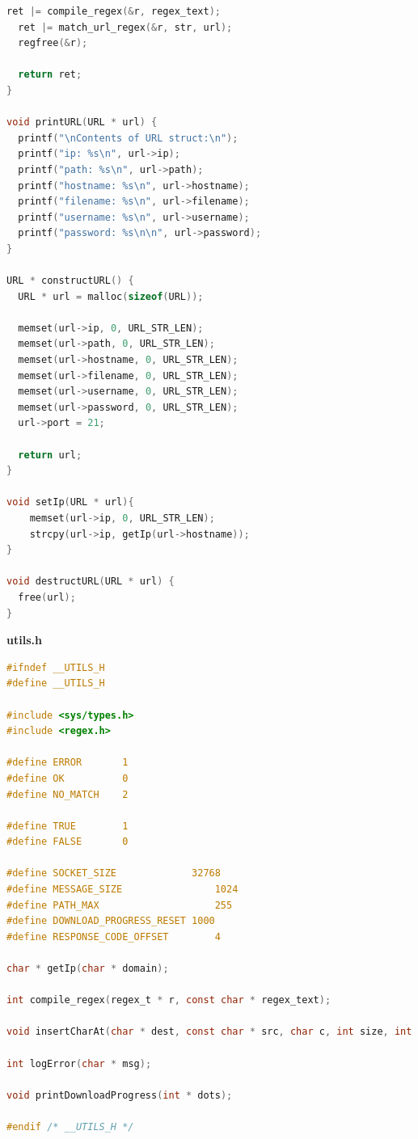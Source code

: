 \documentclass[a4paper, 11pt]{article}
\begin{document}
\begin{lstlisting}[language=C]
  ret |= compile_regex(&r, regex_text);
  ret |= match_url_regex(&r, str, url);
  regfree(&r);

  return ret;
}

void printURL(URL * url) {
  printf("\nContents of URL struct:\n");
  printf("ip: %s\n", url->ip);
  printf("path: %s\n", url->path);
  printf("hostname: %s\n", url->hostname);
  printf("filename: %s\n", url->filename);
  printf("username: %s\n", url->username);
  printf("password: %s\n\n", url->password);
}

URL * constructURL() {
  URL * url = malloc(sizeof(URL));

  memset(url->ip, 0, URL_STR_LEN);
  memset(url->path, 0, URL_STR_LEN);
  memset(url->hostname, 0, URL_STR_LEN);
  memset(url->filename, 0, URL_STR_LEN);
  memset(url->username, 0, URL_STR_LEN);
  memset(url->password, 0, URL_STR_LEN);
  url->port = 21;

  return url;
}

void setIp(URL * url){
    memset(url->ip, 0, URL_STR_LEN);
    strcpy(url->ip, getIp(url->hostname));
}

void destructURL(URL * url) {
  free(url);
}
\end{lstlisting}
\newpage

\huge\textbf{utils.h}
\begin{lstlisting}[language=C]
#ifndef __UTILS_H
#define __UTILS_H

#include <sys/types.h>
#include <regex.h>

#define ERROR	    1
#define OK  	    0
#define NO_MATCH    2

#define TRUE		1
#define FALSE		0

#define SOCKET_SIZE				32768
#define MESSAGE_SIZE				1024
#define PATH_MAX					255
#define DOWNLOAD_PROGRESS_RESET	1000
#define RESPONSE_CODE_OFFSET		4

char * getIp(char * domain);

int compile_regex(regex_t * r, const char * regex_text);

void insertCharAt(char * dest, const char * src, char c, int size, int idx);

int logError(char * msg);

void printDownloadProgress(int * dots);

#endif /* __UTILS_H */
\end{lstlisting}
\newpage
\end{document}
